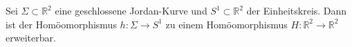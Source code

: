 \begin{satz}
    Sei $\Sigma \subset \mathbb{R}^{2}$ eine geschlossene Jordan-Kurve und $S^1 \subset \mathbb{R}^{2}$ der Einheitskreis. 
    Dann ist der Homöomorphismus $h\colon \Sigma\to S^1$ zu einem Homöomorphismus $H\colon \mathbb{R}^2  \to \mathbb{R}^2$ erweiterbar.
\end{satz}